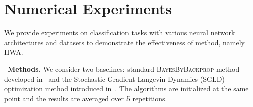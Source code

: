 \documentclass[tablecaption=bottom,wcp]{jmlr} %
\begin{document}
%
%



\section{Numerical Experiments}\label{sec:numerical}
We provide experiments on classification tasks with various neural network architectures and datasets to demonstrate the effectiveness of method, namely HWA.

\noindent --\textbf{Methods.}\hspace{0.1in}
We consider two baselines: standard \textsc{BayesByBackprop} method developed in~\citep{blundell2015weight} and the Stochastic Gradient Langevin Dynamics (SGLD) optimization method introduced in~\citep{welling2011bayesian}.
The algorithms are initialized at the same point and the results are averaged over 5 repetitions.
\end{document}
